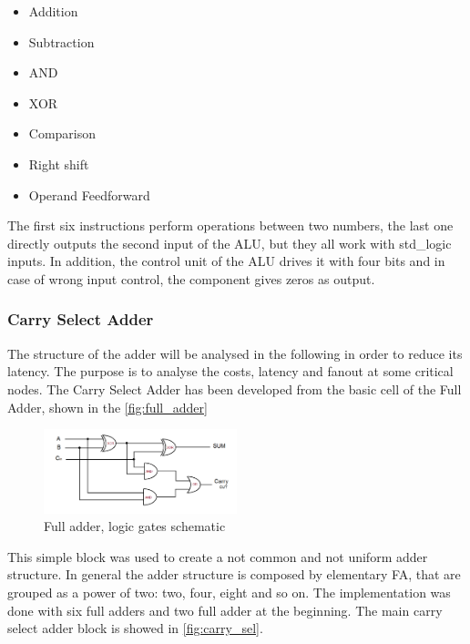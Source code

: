 \begin{itemize}
	\item Addition
	\item Subtraction
	\item AND
	\item XOR
	\item Comparison
	\item Right shift
	\item Operand Feedforward
\end{itemize}
\noindent
The first six instructions perform operations between two numbers, the last one directly outputs the second input of the ALU, but they all work with std\_logic inputs. In addition, the control unit of the ALU drives it with four bits and in case of wrong input control, the component gives zeros as output.

\subsubsection{Carry Select Adder}
The structure of the adder will be analysed in the following in order to reduce its latency. The purpose is to analyse the costs, latency and fanout at some critical nodes. The Carry Select Adder has been developed from the basic cell of the Full Adder, shown in the \autoref{fig:full_adder}

\begin{figure}[htbp]
	\centering
	\includegraphics[width=0.5\textwidth]{sec2/images/full_adder.png}
	\caption{Full adder, logic gates schematic}
	\label{fig:full_adder}
\end{figure}
\noindent
This simple block was used to create a not common and not uniform adder structure. In general the adder structure is composed by elementary FA, that are grouped as a power of two: two, four, eight and so on. The implementation was done with six full adders and two full adder at the beginning. The main carry select adder block is showed in \autoref{fig:carry_sel}.

